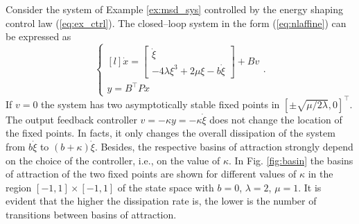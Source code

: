 Consider the system of Example \ref{ex:msd_sys} controlled by the energy shaping control law (\ref{eq:ex_ctrl}). The closed--loop system in the form (\ref{eq:nlaffine}) can be expressed as
%
\begin{equation*}
	\left\{
    \begin{matrix*}[l]
    \dot{x} = \begin{bmatrix}\dot{\xi}\\-4\lambda\xi^3+2\mu\xi-b\dot{\xi}\end{bmatrix} + Bv\\
    y = B^\top Px %
    \end{matrix*}
    \right. .
\end{equation*}
%
If $v= 0$ the system has two asymptotically stable fixed points in $[\pm\sqrt{\mu/2\lambda},0]^\top$. The output feedback controller $v = -\kappa y = -\kappa\dot{\xi}$ does not change the location of the fixed points. In facts, it only changes the overall dissipation of the system from $b\dot{\xi}$ to $(b+\kappa)\dot{\xi}$.
Besides, the respective basins of attraction strongly depend on the choice of the controller, i.e., on the value of $\kappa$. In Fig. \ref{fig:basin} the basins of attraction of the two fixed points are shown for different values of $\kappa$ in the region $[-1,1]\times [-1,1]$ of the state space with $b = 0$, $\lambda = 2$, $\mu = 1$. It is evident that the higher the dissipation rate is, the lower is the number of transitions between basins of attraction.
%
%


